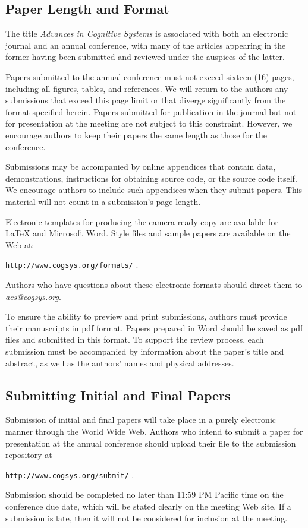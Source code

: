 \documentclass[11pt,letterpaper]{article}
\begin{document}
\subsection{Paper Length and Format}

The title {\it Advances in Cognitive Systems\/} is associated with
both an electronic journal and an annual conference, with many of the
articles appearing in the former having been submitted and reviewed
under the auspices of the latter. 

Papers submitted to the annual conference must not exceed sixteen (16)
pages, including all figures, tables, and references. We will return
to the authors any submissions that exceed this page limit or that
diverge significantly from the format specified herein.
Papers submitted for publication in the journal but not for presentation
at the meeting are not subject to this constraint. However, we encourage 
authors to keep their papers the same length as those for the conference.

Submissions may be accompanied by online appendices that contain data,
demonstrations, instructions for obtaining source code, or the source
code itself. We encourage authors to include such appendices when they
submit papers. This material will not count in a submission's page
length.

Electronic templates for producing the camera-ready copy are available
for \LaTeX\/ and Microsoft Word. Style files and sample papers are 
available on the Web at: 
\vskip 0.1in
\begin{small}
\centerline{{\tt http://www.cogsys.org/formats/} .}
\end{small}
\vskip 0.1in
\noindent
Authors who have questions about these electronic formats should direct
them to {\sl acs@cogsys.org}.

To ensure the ability to preview and print submissions, authors must
provide their manuscripts in pdf format. Papers prepared in Word
should be saved as pdf files and submitted in this format. To support
the review process, each submission must be accompanied by information
about the paper's title and abstract, as well as the authors' names
and physical addresses. 

\subsection{Submitting Initial and Final Papers}

Submission of initial and final papers will take place in a purely
electronic manner through the World Wide Web. Authors who intend to
submit a paper for presentation at the annual conference should upload
their file to the submission repository at
\vskip 0.1in
\begin{small}
\centerline{{\tt http://www.cogsys.org/submit/} .}
\end{small}
\vskip 0.12in
\noindent
Submission should be completed no later than 11:59 PM Pacific time 
on the conference due date, which will be stated clearly on the 
meeting Web site. If a submission is late, then it will not be 
considered for inclusion at the meeting.
\end{document}

